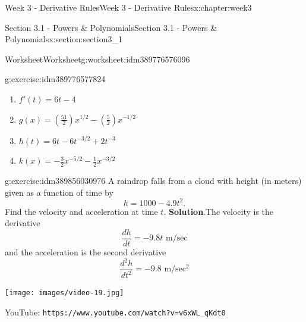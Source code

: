 \documentclass[oneside,10pt,]{book}
\newcommand{\blocktitlefont}{\relax}
\newcommand{\mono}[1]{\texttt{#1}}
\numberwithin{equation}{section}
\newlength{\qrsize}
\newlength{\previewwidth}
\begin{document}
\begin{chapterptx}{Week 3 - Derivative Rules}{}{Week 3 - Derivative Rules}{}{}{x:chapter:week3}
\begin{sectionptx}{Section 3.1 - Powers \& Polynomials}{}{Section 3.1 - Powers \& Polynomials}{}{}{x:section:section3_1}
\begin{worksheet-subsection}{Worksheet}{}{Worksheet}{}{}{g:worksheet:idm389776576096}
\begin{divisionexercise}{1}{}{}{g:exercise:idm389776577824}
\begin{enumerate}[label=(\alph*)]
\item{}\(\displaystyle f'(t) = 6t-4 \)%
\item{}\(\displaystyle g(x) = \left(\frac{51}{2}\right)x^{1/2} - \left( \frac 52 \right) x^{-1/2}\)%
\item{}\(\displaystyle h(t) = 6t -6t^{-3/2} +2t^{-3}\)%
\item{}\(\displaystyle k(x) = -\frac 32 x^{-5/2} - \frac 12 x^{-3/2}\)%
\end{enumerate}
\end{divisionexercise}%
\begin{divisionexercise}{2}{}{}{g:exercise:idm389856030976}%
A raindrop falls from a cloud with height (in meters) given as a function of time by%
\begin{equation*}
h=1000-4.9t^2.
\end{equation*}
Find the velocity and acceleration at time \(t\).%
\textbf{\blocktitlefont Solution}.\hypertarget{g:solution:idm389856035120}{}\quad{}The velocity is the derivative%
\begin{equation*}
\frac{dh}{dt} = -9.8 t \text{ m}/\text{sec}
\end{equation*}
and the acceleration is the second derivative%
\begin{equation*}
\frac{d^2h}{dt^2} = -9.8 \text{ m}/\text{sec}^2
\end{equation*}
%
\end{divisionexercise}%
\end{worksheet-subsection}
\restoregeometry
\setlength{\qrsize}{9em}
\setlength{\previewwidth}{\linewidth}
\addtolength{\previewwidth}{-\qrsize}
\begin{tcbraster}[raster columns=2, raster column skip=1pt, raster halign=center, raster force size=false, raster left skip=0pt, raster right skip=0pt]%
\begin{tcolorbox}[previewstyle, width=\previewwidth]%
\texttt{[image: images/video-19.jpg]}%
\end{tcolorbox}%
\begin{tcolorbox}[qrstyle]%
{\hypersetup{urlcolor=black}}%
\end{tcolorbox}%
\begin{tcolorbox}[captionstyle]%
\small YouTube: \mono{https://www.youtube.com/watch?v=v6xWL\_qKdt0}\end{tcolorbox}%
\end{tcbraster}%
\end{sectionptx}
%
%
\typeout{************************************************}

\end{chapterptx}
\end{document}
